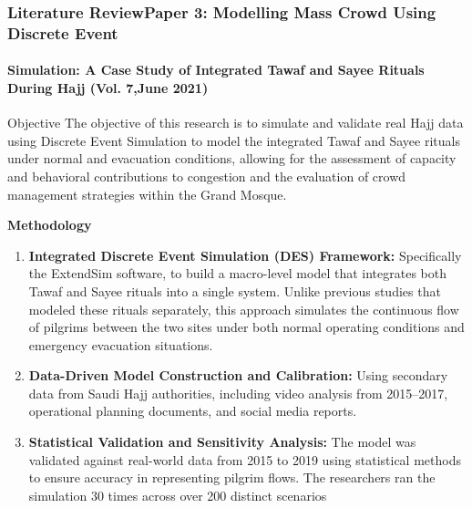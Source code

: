 \documentclass{beamer}
\begin{document}
\begin{frame}
\frametitle{Literature Review\newline Paper 3: Modelling Mass Crowd Using Discrete Event}
\framesubtitle{Simulation: A Case Study of Integrated Tawaf and Sayee Rituals During Hajj (Vol. 7,June 2021)}
\scriptsize

\begin{block}{Objective}
The objective of this research is to simulate and validate real Hajj data using Discrete Event Simulation to model the integrated Tawaf and Sayee rituals under normal and evacuation conditions, allowing for the assessment of capacity and behavioral contributions to congestion and the evaluation of crowd management strategies within the Grand Mosque.
\end{block}



\textbf{Methodology}
\begin{enumerate}
    \item \textbf{Integrated Discrete Event Simulation (DES) Framework:} Specifically the ExtendSim software, to build a macro-level model that integrates both Tawaf and Sayee rituals into a single system. Unlike previous studies that modeled these rituals separately, this approach simulates the continuous flow of pilgrims between the two sites under both normal operating conditions and emergency evacuation situations.
    \item \textbf{Data-Driven Model Construction and Calibration:} Using secondary data from Saudi Hajj authorities, including video analysis from 2015–2017, operational planning documents, and social media reports.
    \item \textbf{Statistical Validation and Sensitivity Analysis:} The model was validated against real-world data from 2015 to 2019 using statistical methods to ensure accuracy in representing pilgrim flows. The researchers ran the simulation 30 times across over 200 distinct scenarios
\end{enumerate}
\end{frame}
\end{document}
